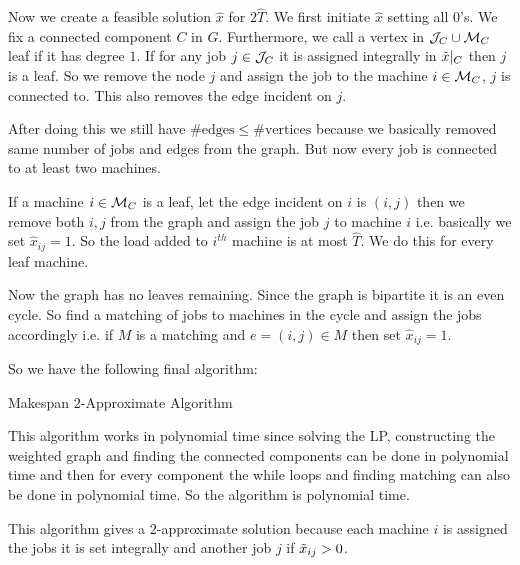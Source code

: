 Now we create a feasible solution $\hat{x}$ for $2\hat{T}$. We first initiate $\hat{x}$ setting all $0$'s. We fix a connected component $C$ in $G$. Furthermore, we call a vertex in $\mathcal{J}_C\cup \mathcal{M}_C$ leaf if it has degree $1$. If for any job $j\in \mathcal{J}_C$ it is assigned integrally in $\tilde{x}|_C$ then $j$ is a leaf. So we remove the node $j$ and assign the job to the machine $i\in \mathcal{M}_C$, $j$ is connected to.  This also removes the edge incident on $j$. 

After doing this we still have $\#\text{edges}\leq \#\text{vertices}$ because we basically removed same number of jobs and edges from the graph. But now every job is connected to at least two machines. 

If a machine $i\in\mathcal{M}_C$ is a leaf, let the edge incident on $i$ is $(i,j)$ then we remove both $i,j$ from the graph and assign the job $j$ to machine $i$ i.e. basically we set $\hat{x}_{ij}=1$. So the load added to $i^{th}$ machine is at most $\hat{T}$. We do this for every leaf machine.

Now the graph has no leaves remaining. Since the graph is bipartite it is an even cycle. So find a matching of jobs to machines in the cycle and assign the jobs accordingly i.e. if $M$ is a matching and $e=(i,j)\in M$ then set $\hat{x}_{ij}=1$.\newpage

So we have the following final algorithm:

\begin{algorithm}
\DontPrintSemicolon
{}
\caption{Makespan $2$-Approximate Algorithm}
\end{algorithm}

This algorithm works in polynomial time since solving the LP,  constructing the weighted graph and finding the connected components can be done in polynomial time and then for every component the while loops and finding matching can also be done in polynomial time. So the algorithm is polynomial time.

This algorithm gives a $2$-approximate solution because each machine $i$ is assigned the jobs it is set integrally and another job $j$ if $\tilde{x}_{ij}>0$. 